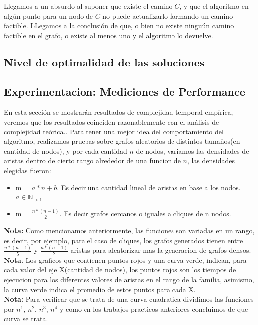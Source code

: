 \vspace{2mm}

Llegamos a un absurdo al suponer que existe el camino $C$, y que el algoritmo en alg\'un punto para un nodo de $C$ no puede actualizarlo formando un camino factible. LLegamos a la conclusi\'on de que, o bien no existe ningu\'un camino factible en el grafo, o existe al menos uno y el algoritmo lo devuelve.

\subsection{Nivel de optimalidad de las soluciones}

\subsection{Experimentacion: Mediciones de Performance}
En esta secci\'on se mostrar\'an resultados de complejidad temporal emp\'irica, veremos que los resultados coinciden razonablemente con el an\'alisis de complejidad te\'orica..
Para tener una mejor idea del comportamiento del algoritmo, realizamos pruebas sobre grafos aleatorios de distintos tama\~nos(en cantidad de nodos), y por cada cantidad $n$ de nodos, variamos las densidades de aristas dentro de cierto rango alrededor de una funcion de $n$, las densidades elegidas fueron:
\begin{itemize}
	\item m = $a*n + b$. Es decir una cantidad lineal de aristas en base a los nodos. $a \in \mathbb{N}_{>1}$
	\item m = $\frac{n*(n-1)}{2}$. Es decir grafos cercanos o iguales a cliques de n nodos.
\end{itemize}


\textbf{Nota: } Como mencionamos anteriormente, las funciones son variadas en un rango, es decir, por ejemplo, para el caso de cliques, los grafos generados tienen entre $\frac{n*(n-1)}{5}$ y $\frac{n*(n-1)}{2}$ aristas para aleatorizar mas la generacion de grafos densos.\\

\textbf{Nota: } Los graficos que contienen puntos rojos y una curva verde, indican, para cada valor del eje X(cantidad de nodos), los puntos rojos son los tiempos de ejecucion para los diferentes valores de aristas en el rango de la familia, asimismo, la curva verde indica el promedio de estos puntos para cada X. \\
\textbf{Nota: }Para verificar que se trata de una curva cuadratica dividimos las funciones por $n^1$, $n^2$, $n^3$, $n^4$ y como en los trabajos practicos anteriores concluimos de que curva se trata.\\

